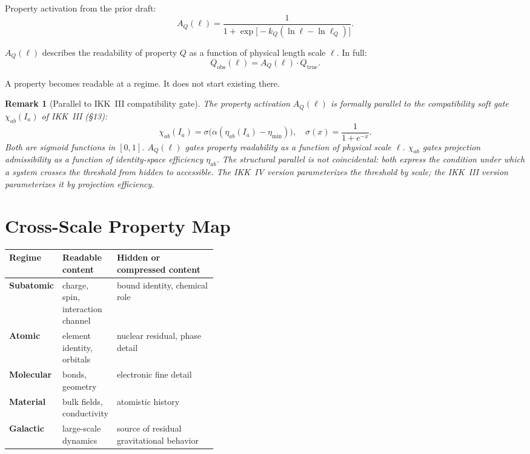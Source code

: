 \documentclass[11pt,a4paper,oneside]{article}
\newtheorem{remark}{Remark}[section]
\newcommand{\Ia}{I_a}                               %
\newcommand{\etaab}{\eta_{ab}}                 %
\newcommand{\AQ}{A_Q(\ell)}                    %
\newcommand{\chiab}{\chi_{ab}}                 %
\begin{document}
Property activation from the prior draft:
\[
\AQ = \frac{1}{1 + \exp\!\big[-k_Q(\ln\ell - \ln\ell_Q)\big]}.
\]

$A_Q(\ell)$ describes the readability of property $Q$ as a function of physical length scale $\ell$. In full:
\[
Q_{\mathrm{obs}}(\ell) = \AQ \cdot Q_{\mathrm{true}}.
\]

A property becomes readable at a regime. It does not start existing there.

\begin{remark}[Parallel to IKK~III compatibility gate]
The property activation $\AQ$ is formally parallel to the compatibility soft gate $\chiab(\Ia)$ of IKK~III (\S{}13):
\[
\chiab(\Ia) = \sigma\!\big(\alpha(\etaab(\Ia) - \eta_{\min})\big),\quad
\sigma(x) = \frac{1}{1+e^{-x}}.
\]
Both are sigmoid functions in $[0,1]$. $\AQ$ gates property readability as a function of physical scale $\ell$. $\chiab$ gates projection admissibility as a function of identity-space efficiency $\etaab$. The structural parallel is not coincidental: both express the condition under which a system crosses the threshold from hidden to accessible. The IKK~IV version parameterizes the threshold by scale; the IKK~III version parameterizes it by projection efficiency.
\end{remark}

\section{Cross-Scale Property Map}

\begin{center}
\begin{tabularx}{\linewidth}{>{\bfseries}p{0.18\linewidth}p{0.22\linewidth}X}
\toprule
Regime & Readable content & Hidden or compressed content \\
\midrule
Subatomic   & charge, spin, interaction channel & bound identity, chemical role \\
Atomic      & element identity, orbitals        & nuclear residual, phase detail \\
Molecular   & bonds, geometry                   & electronic fine detail \\
Material    & bulk fields, conductivity          & atomistic history \\
Galactic    & large-scale dynamics               & source of residual gravitational behavior \\
\bottomrule
\end{tabularx}
\end{center}
\end{document}
